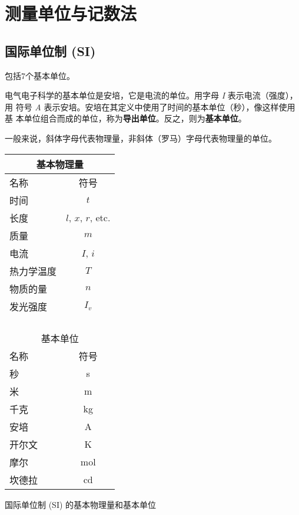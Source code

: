 
\chapter{测量单位与记数法}

\section{国际单位制 (SI)}
 包括7个基本单位。

电气电子科学的基本单位是安培，它是电流的单位。用字母 \emph{I} 表示电流（强度），用
符号 \emph{A} 表示安培。安培在其定义中使用了时间的基本单位（秒），像这样使用基
本单位组合而成的单位，称为\textbf{导出单位}。反之，则为\textbf{基本单位}。

一般来说，斜体字母代表物理量，非斜体（罗马）字母代表物理量的单位。

\begin{margintable}[2cm]
\begin{tabular}{lc}
\toprule
\multicolumn{2}{c}{\normalsize 基本物理量}      \\
\midrule
名称    & 符号 \\
时间    & $t$   \\                
长度    & $l$, $x$, $r$, etc. \\
质量    & $m$          \\
电流    & $I$, $i$       \\       
热力学温度 & $T$           \\        
物质的量  & $n$         \\
发光强度  & $I_v$   \\       
\bottomrule
\\
\\
\\
\\
\toprule
\multicolumn{2}{c}{\normalsize 基本单位} \\
\midrule
名称         & 符号         \\
秒           & s          \\
米           & m          \\
千克          & kg         \\
安培          & A          \\
开尔文         & K          \\
摩尔          & mol        \\
坎德拉         & cd        \\
\bottomrule
\end{tabular}
\caption[SI]{\tiny 国际单位制 (SI) 的基本物理量和基本单位}
\label{tab:SI}
\end{margintable}

